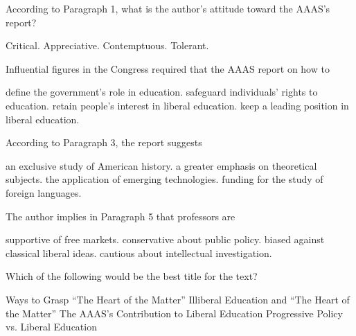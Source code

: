\item According to Paragraph 1, what is the author's attitude toward the AAAS's report?
\begin{tasks}
	\task Critical.
	\task Appreciative.
	\task Contemptuous.
	\task Tolerant.
\end{tasks}
\item Influential figures in the Congress required that the AAAS report on how to
\begin{tasks}
	\task define the government's role in education.
	\task safeguard individuals' rights to education.
	\task retain people's interest in liberal education.
	\task keep a leading position in liberal education.
\end{tasks}
\item According to Paragraph 3, the report suggests
\begin{tasks}
	\task an exclusive study of American history.
	\task a greater emphasis on theoretical subjects.
	\task the application of emerging technologies.
	\task funding for the study of foreign languages.
\end{tasks}
\item The author implies in Paragraph 5 that professors are
\begin{tasks}
	\task supportive of free markets.
	\task conservative about public policy.
	\task biased against classical liberal ideas.
	\task cautious about intellectual investigation.
\end{tasks}
\item Which of the following would be the best title for the text?
\begin{tasks}
	\task Ways to Grasp ``The Heart of the Matter''
	\task Illiberal Education and ``The Heart of the Matter''
	\task The AAAS's Contribution to Liberal Education
	\task Progressive Policy vs. Liberal Education
\end{tasks}
